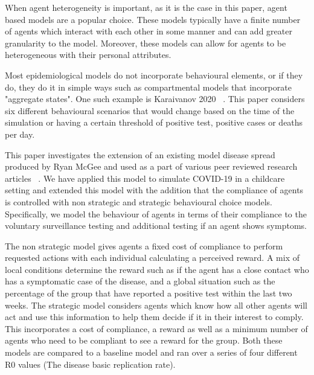 \documentclass{article}
\begin{document}
When agent heterogeneity is important, as it is the case in this paper, agent based models are a popular choice. 
These models typically have a finite number of agents which interact with each other in some manner and can add greater granularity to the model.
Moreover, these models can allow for agents to be heterogeneous with their personal attributes.\newline

Most epidemiological models do not incorporate behavioural elements, or if they do, they do it in simple ways such as compartmental models that incorporate "aggregate states". One such example is Karaivanov 2020 ~\cite{karaivanov_2020}. This paper considers six different behavioural scenarios that would change based on the time of the simulation or having a certain threshold of positive test, positive cases or deaths per day.\newline

This paper investigates the extension of an existing model disease spread produced by Ryan McGee and used as a part of various peer reviewed research articles ~\cite{mcgee_homburger_williams_bergstrom_zhou_2021,mcgee_homburger_williams_bergstrom_zhou_2021_2}. 
We have applied this model to simulate COVID-19 in a childcare setting and extended this model with the addition that the compliance of agents is controlled with non strategic and strategic behavioural choice models. Specifically, we model the behaviour of agents in terms of their compliance to the voluntary surveillance testing and additional testing if an agent shows symptoms. \newline

The non strategic model gives agents a fixed cost of compliance to perform requested actions with each individual calculating a perceived reward. A mix of local conditions determine the reward such as if the agent has a close contact who has a symptomatic case of the disease, and a global situation such as the percentage of the group that have reported a positive test within the last two weeks. The strategic model considers agents which know how all other agents will act and use this information to help them decide if it in their interest to comply. This incorporates a cost of compliance, a reward as well as a minimum number of agents who need to be compliant to see a reward for the group. Both these models are compared to a baseline model and ran over a series of four different R0 values (The disease basic replication rate). \newline
\end{document}
